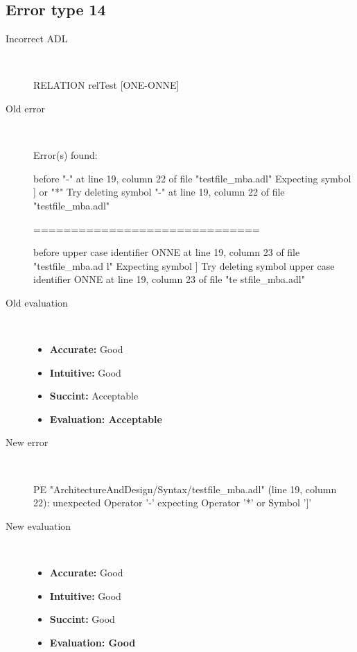 \hrulefill

\subsection{Error type 14}
  \begin{description}
  \item[Incorrect ADL]~\\
\begin{adl}
RELATION relTest [ONE-ONNE]\end{adl}
  \item[Old error]~\\
\begin{haskell}
Error(s) found:

before "-" at line 19, column 22 of file "testfile_mba.adl"
Expecting symbol ] or "*"
Try deleting symbol "-" at line 19, column 22 of file "testfile_mba.adl"

==============================

before upper case identifier ONNE at line 19, column 23 of file "testfile_mba.ad
l"
Expecting symbol ]
Try deleting symbol upper case identifier ONNE at line 19, column 23 of file "te
stfile_mba.adl"\end{haskell}
  \item[Old evaluation]~\\
    \begin{itemize}
    \item \textbf{Accurate:} Good
    \item \textbf{Intuitive:} Good
    \item \textbf{Succint:} Acceptable
    \item \textbf{Evaluation: Acceptable}
    \end{itemize}
  \item[New error]~\\
\begin{haskell}
PE "ArchitectureAndDesign/Syntax/testfile_mba.adl" (line 19, column 22):
unexpected Operator '-'
expecting Operator '*' or Symbol ']'\end{haskell}
  \item[New evaluation]~\\
    \begin{itemize}
    \item \textbf{Accurate:} Good
    \item \textbf{Intuitive:} Good
    \item \textbf{Succint:} Good
    \item \textbf{Evaluation: Good
}
    \end{itemize}
  \end{description}

